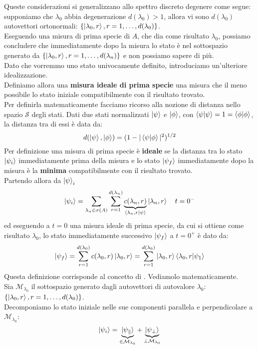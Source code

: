 \documentclass[../../FisicaTeorica.tex]{subfiles}
\begin{document}
Queste considerazioni si generalizzano allo spettro discreto degenere come segue: supponiamo che $\lambda_0$ abbia degenerazione $d(\lambda_0)>1$, allora vi sono $d(\lambda_0)$ autovettori ortonormali: $\{\ket{\lambda_0,r}, r=1,\dots, d(\lambda_0)\}$.\\
Eseguendo una misura di prima specie di $A$, che dia come risultato $\lambda_0$, possiamo concludere che immediatamente dopo la misura lo stato è nel sottospazio generato da $\{\ket{\lambda_0,r}, r=1,\dots, d(\lambda_n)\}$ e non possiamo sapere di più.\\
Dato che vorremmo uno stato univocamente definito, introduciamo un'ulteriore idealizzazione.\\
Definiamo allora una \textbf{misura ideale di prima specie} una misura che  il meno possibile lo stato iniziale compatibilmente con il risultato trovato.\\
Per definirla matematicamente facciamo ricorso alla nozione di distanza nello spazio $\mathcal{S}$ degli stati. Dati due stati normalizzati $\ket{\psi}$ e $\ket{\phi}$, con $\braket{\psi|\psi}=1=\braket{\phi|\phi}$, la distanza tra di essi è data da:
\[
d(\ket{\psi},\ket{\phi}) = (1-|\braket{\psi|\phi}|^2)^{1/2}
\]
Per definizione una misura di prima specie è \textbf{ideale} se la distanza tra lo stato $\ket{\psi_i}$ immediatamente prima della misura e lo stato $\ket{\psi_f}$ immediatamente dopo la misura è la \textbf{minima} compatibilmente con il risultato trovato.\\
Partendo allora da $\ket{\psi}_i$
\[
\ket{\psi_i}=\sum_{\lambda_n \in \sigma(A)}\sum_{r=1}^{d(\lambda_n)} \underbrace{c(\lambda_n,r)}_{\braket{\lambda_n,r|\psi}}\ket{\lambda_n,r}\quad t=0^-
\]
ed eseguendo a $t=0$ una misura ideale di prima specie, da cui si ottiene come risultato $\lambda_0$, lo stato immediatamente successivo $\ket{\psi_f}$ a $t=0^+$ è dato da:
\[
\ket{\psi_f} = \sum_{r=1}^{d(\lambda_0)} c(\lambda_0,r)\ket{\lambda_0, r} = \sum_{r=1}^{d(\lambda_0)}\ket{\lambda_0,r}\braket{\lambda_0,r|\psi_1}
\]
Questa definizione corrisponde al concetto di . Vediamolo matematicamente.\\
Sia $\mathcal{M}_{\lambda_0}$ il sottospazio generato dagli autovettori  di autovalore $\lambda_0$: $\{\ket{\lambda_0,r}, r=1,\dots, d(\lambda_0)\}$.\\
Decomponiamo lo stato iniziale nelle sue componenti parallela e perpendicolare a $\mathcal{M}_{\lambda_0}$:
\begin{equation}
\ket{\psi_i} = \underbrace{\ket{\psi_\parallel}}_{\in \mathcal{M}_{\lambda_0}} + \underbrace{\ket{\psi_\perp}}_{\perp \mathcal{M}_{\lambda_0}}
\label{eqn:decomposizione}
\end{equation}
\end{document}
